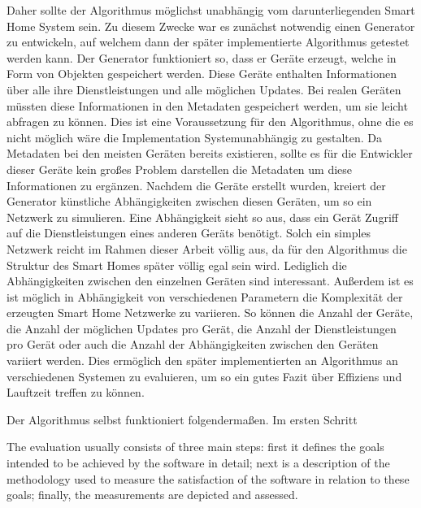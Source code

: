 Daher sollte der Algorithmus möglichst
unabhängig vom darunterliegenden Smart Home System sein. Zu diesem Zwecke war es zunächst 
notwendig einen Generator zu entwickeln, auf welchem dann der später implementierte Algorithmus 
getestet werden kann.  Der Generator funktioniert so, dass er Geräte erzeugt, welche
in Form von Objekten gespeichert werden. Diese Geräte enthalten Informationen über alle ihre Dienstleistungen 
und alle möglichen Updates. Bei realen Geräten müssten diese Informationen in den Metadaten
gespeichert werden, um sie leicht abfragen zu können. Dies ist eine Voraussetzung für den Algorithmus, ohne
die es nicht möglich wäre die Implementation Systemunabhängig zu gestalten. Da Metadaten bei den meisten
Geräten bereits existieren, sollte es für die Entwickler dieser Geräte kein großes Problem darstellen die Metadaten
um diese Informationen zu ergänzen. 
Nachdem die Geräte erstellt wurden, kreiert der Generator künstliche Abhängigkeiten zwischen diesen Geräten, um 
so ein Netzwerk zu simulieren. Eine Abhängigkeit sieht so aus, dass ein Gerät Zugriff auf die Dienstleistungen eines
anderen Geräts benötigt. Solch ein simples Netzwerk reicht im Rahmen dieser Arbeit völlig aus, da für den
Algorithmus die Struktur des Smart Homes später völlig egal sein wird. Lediglich die Abhängigkeiten zwischen den 
einzelnen Geräten sind interessant. Außerdem ist es ist möglich in Abhängigkeit von verschiedenen Parametern die Komplexität
der erzeugten Smart Home Netzwerke zu variieren. So können die Anzahl der Geräte, die Anzahl der möglichen 
Updates pro Gerät, die Anzahl der Dienstleistungen pro Gerät oder auch die Anzahl der Abhängigkeiten zwischen den
Geräten variiert werden. Dies ermöglich den später implementierten an Algorithmus an verschiedenen Systemen zu 
evaluieren, um so ein gutes Fazit über Effiziens und Lauftzeit treffen zu können.  

Der Algorithmus selbst funktioniert folgendermaßen. Im ersten Schritt







The evaluation usually consists of three main steps:
first it defines the goals intended to be achieved by the software in detail;
next is a description of the methodology
used to measure the satisfaction of the software in relation to these goals;
finally, the measurements are depicted and assessed.

